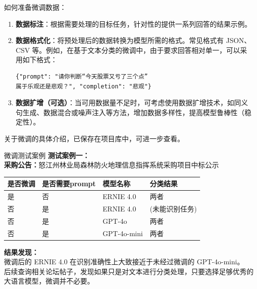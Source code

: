 \documentclass{beamer}
\begin{document}
\begin{frame}[fragile]{如何准备微调数据：}

\begin{enumerate}
    \item \textbf{数据标注}：根据需要处理的目标任务，针对性的提供一系列回答的结果示例。
    \item \textbf{数据格式化}：将预处理后的数据转换为模型所需的格式。常见格式有 JSON、CSV 等。例如，在基于文本分类的微调中，由于要求回答相对单一，可以采用如下格式：
    \begin{verbatim}
{"prompt": "请你判断“今天股票又亏了三个点”
属于乐观还是悲观？", "completion": "悲观"}
    \end{verbatim}
    \item \textbf{数据扩增（可选）}：当可用数据量不足时，可考虑使用数据扩增技术，如同义句生成、数据混合或噪声注入等方法，增加数据多样性，提高模型鲁棒性（稳定性）。
\end{enumerate}

关于微调的具体介绍，已保存在项目库中，可进一步查看。
\end{frame}

\begin{frame}[fragile]{微调测试案例}
    \small
    \textbf{测试案例一：}\\[0.5em]
    \textbf{采购公告：}怒江州林业局森林防火地理信息指挥系统采购项目中标公示\\[1em]
    \begin{tabular}{llll}
    \toprule
    是否微调 & 是否需要prompt & 模型名称 & 分类结果 \\
    \midrule
    是 & 否 & ERNIE 4.0   & 两者 \\
    否 & 是 & ERNIE 4.0      & (未能识别任务) \\
    否 & 是 & GPT-4o            & 两者 \\
    否 & 是 & GPT-4o-mini       & 两者 \\
    \bottomrule
    \end{tabular}
  
    \textbf{结果发现：}\\[0.5em]
    微调后的 ERNIE 4.0 在识别准确性上大致接近于未经过微调的 GPT-4o-mini。\\
    后续查询相关论坛帖子，发现如果只是对文本进行分类处理，只要选择足够优秀的大语言模型，微调并不必要。
    \end{frame}
    


\end{document}

